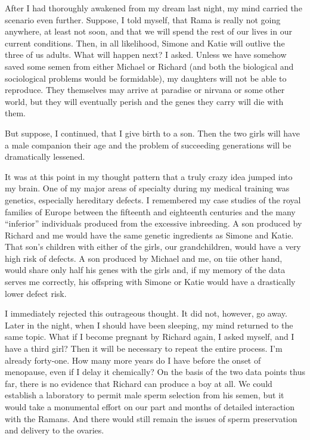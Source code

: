 \documentclass[]{article}
\begin{document}
After I had thoroughly awakened from my dream last night, my mind carried the scenario even further.  Suppose, I told myself, that Rama is really not going anywhere, at least not soon, and that we will spend the rest of our lives in our current conditions.  Then, in all likelihood, Simone and Katie will outlive the three of us adults.  What will happen next? I asked.  Unless we have somehow saved some semen from either Michael or Richard (and both the biological and sociological problems would be formidable), my daughters will not be able to reproduce.  They themselves may arrive at paradise or nirvana or some other world, but they will eventually perish and the genes they carry will die with them.

But suppose, I continued, that I give birth to a son.  Then the two girls will have a male companion their age and the problem of succeeding generations will be dramatically lessened.

It was at this point in my thought pattern that a truly crazy idea jumped into my brain.  One of my major areas of specialty during my medical training was genetics, especially hereditary defects.  I remembered my case studies of the royal families of Europe between the fifteenth and eighteenth centuries and the many “inferior” individuals produced from the excessive inbreeding.  A son produced by Richard and me would have the same genetic ingredients as Simone and Katie.  That son’s children with either of the girls, our grandchildren, would have a very high risk of defects.  A son produced by Michael and me, on tiie other hand, would share only half his genes with the girls and, if my memory of the data serves me correctly, his offspring with Simone or Katie would have a drastically lower defect risk.

I immediately rejected this outrageous thought.  It did not, however, go away.  Later in the night, when I should have been sleeping, my mind returned to the same topic.  What if I become pregnant by Richard again, I asked myself, and I have a third girl? Then it will be necessary to repeat the entire process.  I’m already forty-one.  How many more years do I have before the onset of menopause, even if I delay it chemically? On the basis of the two data points thus far, there is no evidence that Richard can produce a boy at all.  We could establish a laboratory to permit male sperm selection from his semen, but it would take a monumental effort on our part and months of detailed interaction with the Ramans.  And there would still remain the issues of sperm preservation and delivery to the ovaries.
\end{document}
